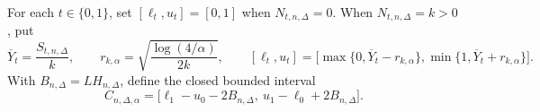 For each \(t\in\{0,1\}\), set \([\ell_t,u_t]=[0,1]\) when \(N_{t,n,\Delta}=0\).  When \(N_{t,n,\Delta}=k>0\), put
\[
 \overline Y_t=\frac{S_{t,n,\Delta}}k,
 \qquad
 r_{k,\alpha}=\sqrt{\frac{\log(4/\alpha)}{2k}},
 \qquad
 [\ell_t,u_t]=\bigl[\max\{0,\overline Y_t-r_{k,\alpha}\},\min\{1,\overline Y_t+r_{k,\alpha}\}\bigr].
\]
With \(B_{n,\Delta}=LH_{n,\Delta}\), define the closed bounded interval
\[
 C_{n,\Delta,\alpha}
 =\bigl[\ell_1-u_0-2B_{n,\Delta},\ u_1-\ell_0+2B_{n,\Delta}\bigr].
\]